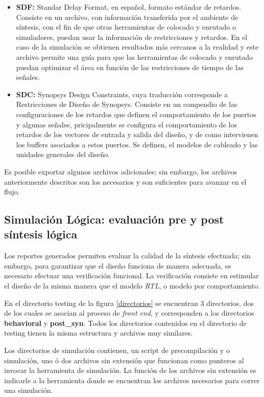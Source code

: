 \begin{itemize}
\item \textbf{SDF:} {Standar Delay Format, en español, formato estándar de retardos. Consiste en un archivo, con información transferida por el ambiente de síntesis, con el fin de que otras herramientas de colocado y enrutado o simuladores, puedan usar la información de restricciones y retardos. En el caso de la simulación se obtienen resultados más cercanos a la realidad y este archivo permite una guía para que las herramientas de colocado y enrutado puedan optimizar el área en función de las restricciones de tiempo de las señales.}

\item \textbf{SDC:} {Synopsys Design Constraints, cuya traducción corresponde a Restricciones de Diseño de Synopsys. Consiste en un compendio de las configuraciones de los retardos que definen el comportamiento de los puertos y algunas señales, pricipalmente se configura el comportamiento de los retardos de los vectores de entrada y salida del diseño, y de como intervienen los buffers asociados a estos puertos. Se definen, el modelos de cableado y las unidades generales del diseño.}

\end{itemize}

Es posible exportar algunos archivos adicionales; sin embargo, los archivos anteriormente descritos son los necesarios y son suficientes para avanzar en el flujo.

\subsection{Simulación Lógica: evaluación pre y post síntesis lógica}
\label{sec:log_sim}
Los reportes generados permiten evaluar la calidad de la síntesis efectuada; sin embargo, para garantizar que el diseño funciona de manera adecuada, es necesario efectuar una verificación funcional. La verificación consiste en estimular el diseño de la misma manera que el modelo \textit{RTL}, o modelo por comportamiento.

En el directorio testing de la figura \ref{directorios} se encuentran 3 directorios, dos de los cuales se asocian al proceso de \textit{front end}, y corresponden a los directorios \textbf{behavioral} y \textbf{post\_syn}. Todos los directorios contenidos en el directorio de testing tienen la misma estructura y archivos muy similares.

Los directorios de simulación contienen, un script de precompilación y o simulación, uno ó dos archivos sin extensión que funcionan como punteros al invocar la herramienta de simulación. La función de los archivos sin extensión es indicarle a la herramienta donde se encuentran los archivos necesarios para correr una simulación.

